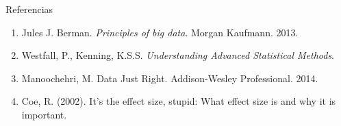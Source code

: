 
\begin{frame}{Referencias}
\begin{enumerate}
 \item Jules J. Berman. \textit{Principles of big data}. Morgan Kaufmann. 2013.
 \item Westfall, P., Kenning, K.S.S. \textit{Understanding Advanced Statistical Methods}.
 \item Manoochehri, M. Data Just Right. Addison-Wesley Professional. 2014.
 \item Coe, R. (2002). It's the effect size, stupid: What effect size is and why it is important.
\end{enumerate}


\end{frame}



